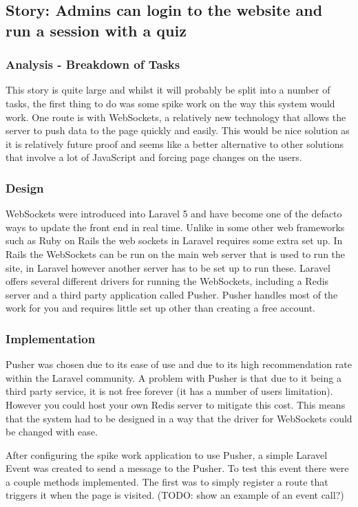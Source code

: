 \subsection{Story: Admins can login to the website and run a session with a quiz}
\subsubsection{Analysis - Breakdown of Tasks}
This story is quite large and whilst it will probably be split into a number of tasks, the first thing to do was some spike work on the way this system would work. One route is with WebSockets, a relatively new technology that allows the server to push data to the page quickly and easily. This would be nice solution as it is relatively future proof and seems like a better alternative to other solutions that involve a lot of JavaScript and forcing page changes on the users.
\subsubsection{Design}
WebSockets were introduced into Laravel 5 and have become one of the defacto ways to update the front end in real time. Unlike in some other web frameworks such as Ruby on Rails the web sockets in Laravel requires some extra set up. In Rails the WebSockets can be run on the main web server that is used to run the site\cite{rails-websockets}, in Laravel however another server has to be set up to run these. Laravel offers several different drivers for running the WebSockets, including a Redis server and a third party application called Pusher\cite{laravel-broadcasting}. Pusher handles most of the work for you and requires little set up other than creating a free account\cite{pusher-what-is}.
\subsubsection{Implementation}
Pusher was chosen due to its ease of use and due to its high recommendation rate within the Laravel community. A problem with Pusher is that due to it being a third party service, it is not free forever (it has a number of users limitation). However you could host your own Redis server to mitigate this cost. This means that the system had to be designed in a way that the driver for WebSockets could be changed with ease.

After configuring the spike work application to use Pusher, a simple Laravel Event was created to send a message to the Pusher. To test this event there were a couple methods implemented. The first was to simply register a route that triggers it when the page is visited. (TODO: show an example of an event call?)
 
